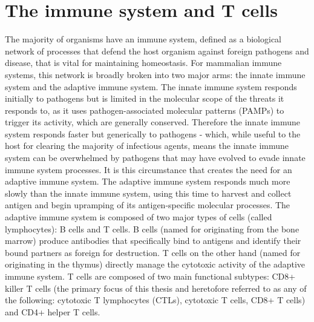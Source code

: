 \section{The immune system and T cells}
The majority of organisms have an immune system, defined as a biological network of processes that defend the host organism against foreign pathogens and disease, that is vital for maintaining homeostasis. For mammalian immune systems, this network is broadly broken into two major arms: the innate immune system and the adaptive immune system. The innate immune system responds initially to pathogens but is limited in the molecular scope of the threats it responds to, as it uses pathogen-associated molecular patterns (PAMPs) to trigger its activity, which are generally conserved. Therefore the innate immune system responds faster but generically to pathogens - which, while useful to the host for clearing the majority of infectious agents, means the innate immune system can be overwhelmed by pathogens that may have evolved to evade innate immune system processes. It is this circumstance that creates the need for an adaptive immune system.
The adaptive immune system responds much more slowly than the innate immune system, using this time to harvest and collect antigen and begin upramping of its antigen-specific molecular processes. The adaptive immune system is composed of two major types of cells (called lymphocytes): B cells and T cells. B cells (named for originating from the bone marrow) produce antibodies that specifically bind to antigens and identify their bound partners as foreign for destruction. T cells on the other hand (named for originating in the thymus) directly manage the cytotoxic activity of the adaptive immune system. T cells are composed of two main functional subtypes: CD8+ killer T cells (the primary focus of this thesis and heretofore referred to as any of the following: cytotoxic T lymphocytes (CTLs), cytotoxic T cells, CD8+ T cells) and CD4+ helper T cells. 

